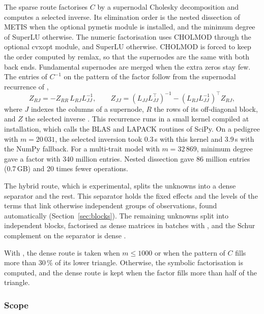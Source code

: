 \documentclass[article,nojss]{jss}
\renewcommand{\pkg}[1]{#1}
\begin{document}
The sparse route factorises $C$ by a supernodal Cholesky decomposition and
computes a selected inverse. Its elimination order is the nested dissection
of \pkg{METIS} \citep{karypis1998} when the optional \pkg{pymetis} module is
installed, and the minimum degree of \pkg{SuperLU} \citep{li2005} otherwise.
The numeric factorisation uses \pkg{CHOLMOD} \citep{chen2008} through the
optional \pkg{cvxopt} module, and \pkg{SuperLU} otherwise. \pkg{CHOLMOD} is
forced to keep the order computed by \pkg{remlax}, so that the supernodes are
the same with both back ends. Fundamental supernodes are merged when the
extra zeros stay few. The entries of $C^{-1}$ on the pattern of the factor
follow from the supernodal recurrence of \citet{takahashi1973},
\begin{equation}\label{eq:takahashi}
  Z_{RJ} = -Z_{RR}\, L_{RJ} L_{JJ}^{-1},
  \qquad
  Z_{JJ} = (L_{JJ}L_{JJ}^\top)^{-1} - (L_{RJ}L_{JJ}^{-1})^\top Z_{RJ},
\end{equation}
where $J$ indexes the columns of a supernode, $R$ the rows of its off-diagonal
block, and $Z$ the selected inverse \citep{masuda2014}. This recurrence runs in
a small  kernel compiled at installation, which calls the
\pkg{BLAS} and \pkg{LAPACK} routines of \pkg{SciPy}. On a pedigree with $m =
20\,031$, the selected inversion took 0.3\,s with this kernel and 3.9\,s with
the \pkg{NumPy} fallback. For a multi-trait model with $m = 32\,869$, minimum
degree gave a factor with 340 million entries. Nested dissection gave 86
million entries (0.7\,GB) and 20 times fewer operations.

The hybrid route, which is experimental, splits the unknowns into a dense
separator and the rest. This separator holds the fixed effects and the levels
of the terms that link otherwise independent groups of observations, found
automatically (Section~\ref{sec:blocks}). The remaining unknowns split into
independent blocks, factorised as dense matrices in batches with , and the
Schur complement on the separator is dense \citep{melsen2026}.

With , the dense route is taken when $m \le 1000$ or
when the pattern of $C$ fills more than 30\,\% of its lower triangle.
Otherwise, the symbolic factorisation is computed, and the dense route is kept
when the factor fills more than half of the triangle.

\subsubsection{Scope}
\end{document}
